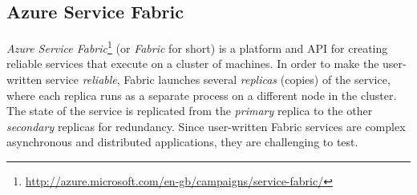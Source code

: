 
\subsection{Azure Service Fabric}
\label{sec:cases:fabric}

\emph{Azure Service Fabric}\footnote{\url{http://azure.microsoft.com/en-gb/campaigns/service-fabric/}} (or \emph{Fabric} for short) is a platform and API for creating reliable services that execute on a cluster of machines. 
In order to make the user-written service \emph{reliable}, Fabric launches several \emph{replicas} (copies) of the service, where each replica runs as a separate process on a different node in the cluster.
The state of the service is replicated from the \emph{primary} replica to the other \emph{secondary} replicas for redundancy.
Since user-written Fabric services are complex asynchronous and distributed applications, 
they are challenging to test.

